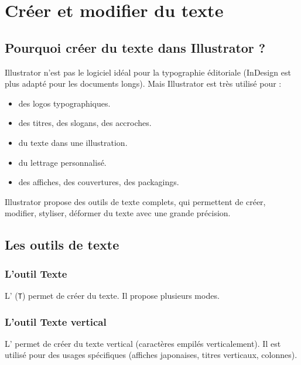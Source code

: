 \section{Créer et modifier du texte}

\subsection{Pourquoi créer du texte dans Illustrator ?}

Illustrator n'est pas le logiciel idéal pour la typographie éditoriale (InDesign est plus adapté pour les documents longs). Mais Illustrator est très utilisé pour :

\begin{itemize}
    \item {} des logos typographiques.
    \item {} des titres, des slogans, des accroches.
    \item {} du texte dans une illustration.
    \item {} du lettrage personnalisé.
    \item {} des affiches, des couvertures, des packagings.
\end{itemize}

Illustrator propose des outils de texte complets, qui permettent de créer, modifier, styliser, déformer du texte avec une grande précision.

\subsection{Les outils de texte}

\subsubsection{L'outil Texte}

L' (\texttt{T}) permet de créer du texte. Il propose plusieurs modes.

\subsubsection{L'outil Texte vertical}

L' permet de créer du texte vertical (caractères empilés verticalement). Il est utilisé pour des usages spécifiques (affiches japonaises, titres verticaux, colonnes).

